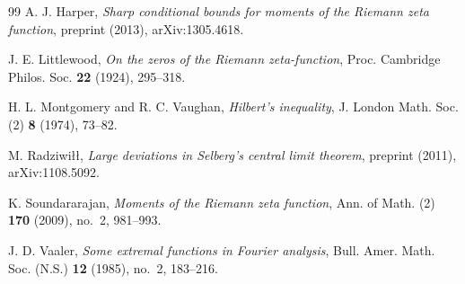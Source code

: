 \documentclass[11pt,a4paper]{amsart}
\theoremstyle{remark}
\numberwithin{equation}{section}
\begin{document}
\begin{thebibliography}{99}
A. J. Harper, \emph{Sharp conditional bounds for moments of the Riemann zeta function}, preprint (2013), arXiv:1305.4618.

J. E. Littlewood, \emph{On the zeros of the Riemann zeta-function}, Proc. Cambridge Philos. Soc. \textbf{22} (1924), 295--318.

H. L. Montgomery and R. C. Vaughan, \emph{Hilbert's inequality}, J. London Math. Soc. (2) \textbf{8} (1974), 73--82.

M. Radziwi\l\l{}, \emph{Large deviations in Selberg's central limit theorem}, preprint (2011), arXiv:1108.5092.

K. Soundararajan, \emph{Moments of the Riemann zeta function}, Ann. of Math. (2) \textbf{170} (2009), no.~2, 981--993.

J. D. Vaaler, \emph{Some extremal functions in Fourier analysis}, Bull. Amer. Math. Soc. (N.S.) \textbf{12} (1985), no.~2, 183--216.

\end{thebibliography}
\end{document}
